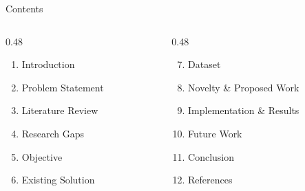 \begin{frame}{Contents}
  \begin{columns}[T]
    \begin{column}{0.48\textwidth}
      \begin{enumerate}
        \item Introduction
        \item Problem Statement
        \item Literature Review
        \item Research Gaps
        \item Objective
        \item Existing Solution
      \end{enumerate}
    \end{column}
    \begin{column}{0.48\textwidth}
      \begin{enumerate}
        \setcounter{enumi}{6}
        \item Dataset
        \item Novelty \& Proposed Work
        \item Implementation \& Results
        \item Future Work
        \item Conclusion
        \item References
      \end{enumerate}
    \end{column}
  \end{columns}
\end{frame}
